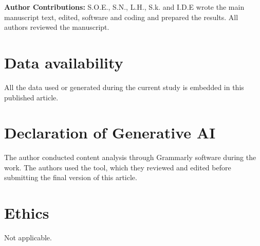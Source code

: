 \documentclass[11pt]{article}
\numberwithin{equation}{section}
\begin{document}
\noindent \textbf{Author Contributions:} S.O.E., S.N., L.H., S.k.  and I.D.E wrote the main manuscript text, edited, software and coding and prepared the results. All authors reviewed the manuscript.

\section*{Data availability}
All the data used or generated during the current study is embedded in this published article.

\section*{Declaration of Generative AI}
The author conducted content analysis through Grammarly software during the work. The authors used the tool, which they reviewed and edited before submitting the final version of this article.

\section*{Ethics}
Not applicable.
\end{document}
